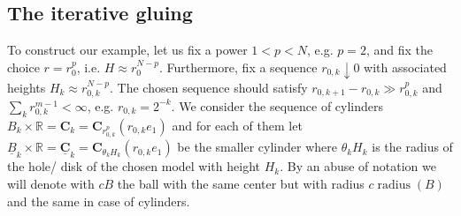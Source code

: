 \documentclass[reqno]{amsart}
\theoremstyle{definition}
\theoremstyle{remark}
\numberwithin{equation}{section}
\newcommand{\R}{\mathbb{R}}
\DeclareMathOperator{\reg}{reg}
\newcommand{\bC}{\mathbf{C}} %
\newcommand{\bG}{\mathbf{G}} %
\begin{document}



\subsection{The iterative gluing}\label{subsec.iterative gluing}

To construct our example, let us fix a power $1<p<N$, e.g. $p=2$, and fix the choice $r=r_0^p$, i.e. $H\approx r_0^{N-p}$. Furthermore, fix a sequence $r_{0,k} \downarrow 0$ with associated heights $H_k\approx r_{0,k}^{N-p}$. The chosen sequence should satisfy $r_{0,{k+1}}-r_{0,k} \gg r_{0,k}^p$ and $\sum_{k} r_{0,k}^{m-1} < \infty$, e.g. $r_{0,k}=2^{-k}$. 
We consider the sequence of cylinders $B_k\times \R=\bC_k=\bC_{r_{0,k}^p}(r_{0,k} e_1)$ and for each of them let $\underline{B}_k \times \R=\underline{\bC}_k=\bC_{\theta_k H_k}(r_{0,k} e_1)$ be the smaller cylinder where $\theta_k H_k$ is the radius of the hole/ disk of the chosen model with height $H_k$. By an abuse of notation we will denote with $c B$ the ball  with the same center but with radius $c\operatorname{radius}(B)$ and the same in case of cylinders. 
\end{document}
